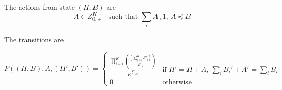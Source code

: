 \documentclass[12pt]{exam}
\begin{document}
\begin{questions}
\begin{solution}
The actions from state $(H, B)$ are 
\[A \in Z_{0,+}^K \quad \text{such that } \sum_{i} A_ \geq 1,\ A \preceq B \]

The transitions are 

\[P((H, B), A, (H', B')) = \begin{cases} \frac{\prod_{i=1}^K {(\sum_{j=i}^{K} B'_j) \choose B'_j}}{K^{\sum_{B'_i}}} &\text{if } H' = H + A,\ \sum_{i}B_i' + A' = \sum_i B_i \\ 0 &\text{otherwise}\end{cases}\]

\end{solution}




\end{questions}
\end{document}
